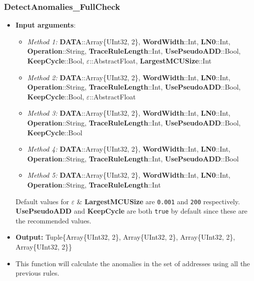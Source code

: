  \subsubsection*{DetectAnomalies\_FullCheck}\label{Fun:DetectAnomaliesFullCheck}
 \begin{itemize}
 	\item \textbf{Input arguments}:
 	\begin{itemize}
 		\item  \textit{Method 1: }\textbf{DATA}::Array\{UInt32, 2\}, 
 		\textbf{WordWidth}::Int,
 		\textbf{LN0}::Int, \\
 		\textbf{Operation}::String,
 		\textbf{TraceRuleLength}::Int,
 		\textbf{UsePseudoADD}::Bool,\\
 		\textbf{KeepCycle}::Bool,
 		\textbf{\(\varepsilon\)}::AbstractFloat,
 		\textbf{LargestMCUSize}::Int
 		\item  \textit{Method 2: }\textbf{DATA}::Array\{UInt32, 2\}, 
 		\textbf{WordWidth}::Int,
 		\textbf{LN0}::Int, \\
 		\textbf{Operation}::String,
 		\textbf{TraceRuleLength}::Int,
 		\textbf{UsePseudoADD}::Bool, \\
 		\textbf{KeepCycle}::Bool,
 		\textbf{\(\varepsilon\)}::AbstractFloat
 		\item  \textit{Method 3: }\textbf{DATA}::Array\{UInt32, 2\}, 
 		\textbf{WordWidth}::Int,
 		\textbf{LN0}::Int, \\
 		\textbf{Operation}::String,
 		\textbf{TraceRuleLength}::Int,
 		\textbf{UsePseudoADD}::Bool,\\
 		\textbf{KeepCycle}::Bool
 		\item  \textit{Method 4: }\textbf{DATA}::Array\{UInt32, 2\}, 
 		\textbf{WordWidth}::Int,
 		\textbf{LN0}::Int, \\
 		\textbf{Operation}::String,
 		\textbf{TraceRuleLength}::Int,
 		\textbf{UsePseudoADD}::Bool
 		\item  \textit{Method 5: }\textbf{DATA}::Array\{UInt32, 2\}, 
 		\textbf{WordWidth}::Int,
 		\textbf{LN0}::Int, \\
 		\textbf{Operation}::String,
 		\textbf{TraceRuleLength}::Int
 	\end{itemize}
 	
 	Default values for \textbf{\(\varepsilon\)} \& 	\textbf{LargestMCUSize} are \texttt{0.001} and \texttt{200} respectively.   \textbf{UsePseudoADD} and \textbf{KeepCycle} are both \texttt{true} by default since these are the recommended values.
 	\item \textbf{Output: } Tuple\{Array\{UInt32, 2\}, Array\{UInt32, 2\}, Array\{UInt32, 2\}, Array\{UInt32, 2\}\}	
 	\item This function will calculate the anomalies in the set of addresses using all the previous rules.
 	 

\end{itemize}
